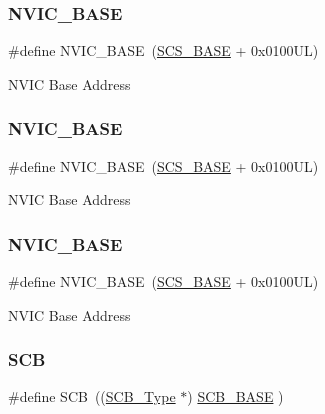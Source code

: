 \subsubsection{\texorpdfstring{NVIC\_BASE}{NVIC\_BASE}\hspace{0.1cm}{\footnotesize\ttfamily [4/6]}}
{\footnotesize\ttfamily \#define N\+V\+I\+C\+\_\+\+B\+A\+SE~(\mbox{\hyperlink{group___c_m_s_i_s__core__base_ga3c14ed93192c8d9143322bbf77ebf770}{S\+C\+S\+\_\+\+B\+A\+SE}} +  0x0100\+U\+L)}

N\+V\+IC Base Address \mbox{\label{group___c_m_s_i_s__core__base_gaa0288691785a5f868238e0468b39523d}} 
\subsubsection{\texorpdfstring{NVIC\_BASE}{NVIC\_BASE}\hspace{0.1cm}{\footnotesize\ttfamily [5/6]}}
{\footnotesize\ttfamily \#define N\+V\+I\+C\+\_\+\+B\+A\+SE~(\mbox{\hyperlink{group___c_m_s_i_s__core__base_ga3c14ed93192c8d9143322bbf77ebf770}{S\+C\+S\+\_\+\+B\+A\+SE}} +  0x0100\+U\+L)}

N\+V\+IC Base Address \mbox{\label{group___c_m_s_i_s__core__base_gaa0288691785a5f868238e0468b39523d}} 
\subsubsection{\texorpdfstring{NVIC\_BASE}{NVIC\_BASE}\hspace{0.1cm}{\footnotesize\ttfamily [6/6]}}
{\footnotesize\ttfamily \#define N\+V\+I\+C\+\_\+\+B\+A\+SE~(\mbox{\hyperlink{group___c_m_s_i_s__core__base_ga3c14ed93192c8d9143322bbf77ebf770}{S\+C\+S\+\_\+\+B\+A\+SE}} +  0x0100\+U\+L)}

N\+V\+IC Base Address \mbox{\label{group___c_m_s_i_s__core__base_gaaaf6477c2bde2f00f99e3c2fd1060b01}} 
\subsubsection{\texorpdfstring{SCB}{SCB}\hspace{0.1cm}{\footnotesize\ttfamily [1/6]}}
{\footnotesize\ttfamily \#define S\+CB~((\mbox{\hyperlink{struct_s_c_b___type}{S\+C\+B\+\_\+\+Type}}       $\ast$)     \mbox{\hyperlink{group___c_m_s_i_s__core__base_gad55a7ddb8d4b2398b0c1cfec76c0d9fd}{S\+C\+B\+\_\+\+B\+A\+SE}}      )}

